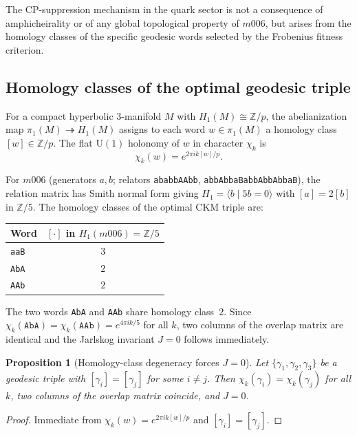 ﻿\documentclass[12pt]{article}
\newtheorem{proposition}[theorem]{Proposition}
\theoremstyle{definition}
\begin{document}
The CP-suppression mechanism in the quark sector is not a consequence
of amphicheirality or of any global topological property of $m006$,
but arises from the homology classes of the specific geodesic words
selected by the Frobenius fitness criterion.

\subsection{Homology classes of the optimal geodesic triple}

For a compact hyperbolic 3-manifold $M$ with $H_1(M)\cong\mathbb{Z}/p$,
the abelianization map $\pi_1(M)\twoheadrightarrow H_1(M)$ assigns to
each word $w\in\pi_1(M)$ a homology class $[w]\in\mathbb{Z}/p$.
The flat $\mathrm{U}(1)$ holonomy of $w$ in character $\chi_k$ is
\[
  \chi_k(w) = e^{2\pi i k [w]/p}.
\]

For $m006$ (generators $a,b$; relators \texttt{ababbAAbb},
\texttt{abbAbbaBabbAbbAbbaB}), the relation matrix has Smith normal form
giving $H_1 = \langle b\mid 5b=0\rangle$ with $[a]=2[b]$ in $\mathbb{Z}/5$.
The homology classes of the optimal CKM triple are:
\begin{center}\small
\begin{tabular}{lc}
\toprule
Word & $[\cdot]$ in $H_1(m006)=\mathbb{Z}/5$ \\
\midrule
\texttt{aaB} & $3$ \\
\texttt{AbA} & $2$ \\
\texttt{AAb} & $2$ \\
\bottomrule
\end{tabular}
\end{center}

The two words \texttt{AbA} and \texttt{AAb} share homology class~$2$.
Since $\chi_k(\texttt{AbA})=\chi_k(\texttt{AAb})=e^{4\pi ik/5}$ for all $k$,
two columns of the overlap matrix are identical and the Jarlskog
invariant $J=0$ follows immediately.

\begin{proposition}[Homology-class degeneracy forces $J=0$]
\label{prop:hom_class}
Let $\{\gamma_1,\gamma_2,\gamma_3\}$ be a geodesic triple with
$[\gamma_i]=[\gamma_j]$ for some $i\neq j$.
Then $\chi_k(\gamma_i)=\chi_k(\gamma_j)$ for all $k$,
two columns of the overlap matrix coincide, and $J=0$.
\end{proposition}

\begin{proof}
Immediate from $\chi_k(w)=e^{2\pi ik[w]/p}$ and $[\gamma_i]=[\gamma_j]$.
\end{proof}
\end{document}
